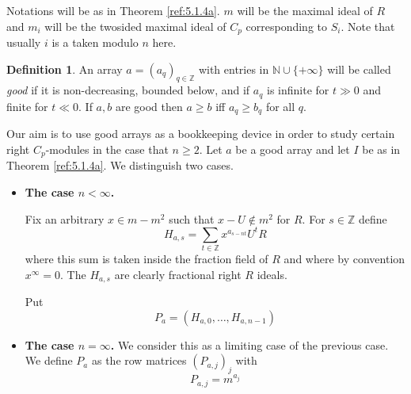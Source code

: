 \documentclass{amsproc}
\def \ZZ{{\mathbb Z}}
\def \NN{{\mathbb N}}
\theoremstyle{definition}
\newtheorem{definitions}[lemmas]{Definition}
\theoremstyle{remark}
\numberwithin{equation}{section}
\numberwithin{table}{section}
\numberwithin{figure}{section}
\begin{document}
 Notations will be as in Theorem \ref{ref:5.1.4a}.
$m$ will be the maximal ideal of $R$ and $m_i$ will be the twosided
maximal ideal of $C_p$ corresponding to $S_i$. Note that usually $i$
is a taken modulo  $n$ here.
\begin{definitions}
An array $a=(a_q)_{q\in\ZZ}$ with entries in $\NN\cup \{+\infty\}$ will be 
called \emph{good} if it is non-decreasing, bounded below, and if $a_q$ is
 infinite for $t\gg 0$ and finite for $t\ll 0$. If $a,b$ are good then
 $a\ge b$ iff $a_q\ge b_q$ for all $q$.
\end{definitions}
Our aim is to use good arrays as a bookkeeping device in order to
study certain right $C_p$-modules in the case that $n\ge 2$. Let $a$
be a good array and let $I$ be as in Theorem \ref{ref:5.1.4a}. We distinguish two cases.
\begin{itemize}
\item
\textbf{The case { $n< \infty$}. }

Fix an arbitrary $x\in m-m^2$
such that $x-U\not\in m^2$
for $R$.
For $s\in \ZZ$ define 
\[
H_{a,s}=\sum_{t\in\ZZ}  x^{a_{s-nt}}U^t R
\]
where this sum is taken inside the fraction field of $R$ and where by
convention $x^\infty=0$. The $H_{a,s}$ are clearly fractional right $R$
ideals.

Put
 \[
 P_{a}=(H_{a,0},\ldots, H_{a,n-1})
 \]
\item
\textbf{The case { $n=\infty$}. }
We consider this as a limiting case of the previous case.
We define
$P_a$ as the row matrices $(P_{a,j})_j$ with
\[
P_{a,j}=m^{a_j}
\]
\end{itemize}
\end{document}
